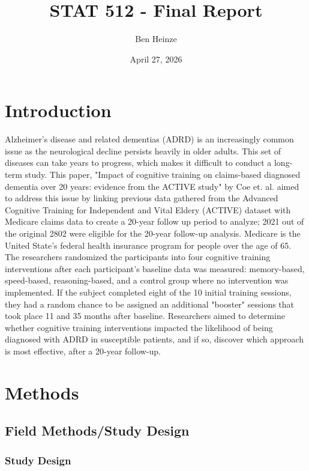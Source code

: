 \documentclass[11pt]{article}
\author{Ben Heinze}
\date{April 27, 2026}
\title{STAT 512 - Final Report}
\begin{document}
\maketitle
\tableofcontents


\section{Introduction}
\label{sec:org6b7a8da}


Alzheimer's disease and related dementias (ADRD) is an increasingly common issue as the neurological decline persists heavily in older adults.
This set of diseases can take years to progress, which makes it difficult to conduct a long-term study.
This paper, "Impact of cognitive training on claims-based diagnosed dementia over 20 years: evidence from the ACTIVE study" by Coe et. al. aimed to address this issue by linking previous data gathered from the Advanced Cognitive Training for Independent and Vital Eldery (ACTIVE) dataset with Medicare claims data to create a 20-year follow up period to analyze; 2021 out of the original 2802 were eligible for the 20-year follow-up analysis. Medicare is the United State's federal health insurance program for people over the age of 65.
The researchers randomized the participants into four cognitive training interventions after each participant's baseline data was measured: memory-based, speed-based, reasoning-based, and a control group where no intervention was implemented.
If the subject completed eight of the 10 initial training sessions, they had a random chance to be assigned an additional "booster" sessions that took place 11 and 35 months after baseline.
Researchers aimed to determine whether cognitive training interventions impacted the likelihood of being diagnosed with ADRD in susceptible patients, and if so, discover which approach is most effective, after a 20-year follow-up.

\section{Methods}
\label{sec:org12c0323}


\subsection{Field Methods/Study Design}
\label{sec:orgc021890}

\subsubsection{Study Design}
\label{sec:orgc1f0418}
\end{document}
